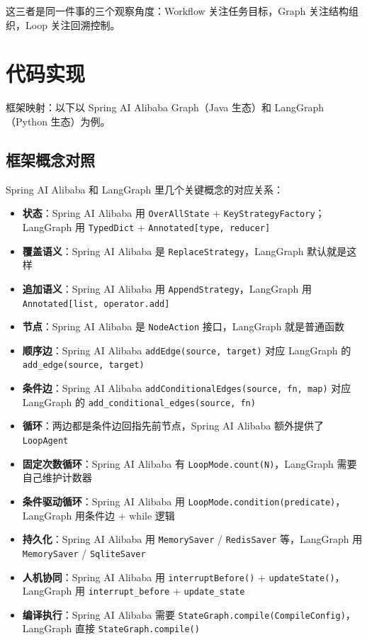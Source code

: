 \documentclass[9pt,a4paper,twocolumn]{ctexart}
\begin{document}
这三者是同一件事的三个观察角度：Workflow 关注任务目标，Graph 关注结构组织，Loop 关注回溯控制。



\section*{代码实现}


框架映射：以下以 Spring AI Alibaba Graph（Java 生态）和 LangGraph（Python 生态）为例。



\subsection*{框架概念对照}


Spring AI Alibaba 和 LangGraph 里几个关键概念的对应关系：


\begin{itemize}[itemsep=1pt, topsep=2pt]
  \item \textbf{状态}：Spring AI Alibaba 用 \texttt{OverAllState} + \texttt{KeyStrategyFactory}；LangGraph 用 \texttt{TypedDict} + \texttt{Annotated[type, reducer]}
  \item \textbf{覆盖语义}：Spring AI Alibaba 是 \texttt{ReplaceStrategy}，LangGraph 默认就是这样
  \item \textbf{追加语义}：Spring AI Alibaba 用 \texttt{AppendStrategy}，LangGraph 用 \texttt{Annotated[list, operator.add]}
  \item \textbf{节点}：Spring AI Alibaba 是 \texttt{NodeAction} 接口，LangGraph 就是普通函数
  \item \textbf{顺序边}：Spring AI Alibaba \texttt{addEdge(source, target)} 对应 LangGraph 的 \texttt{add\_edge(source, target)}
  \item \textbf{条件边}：Spring AI Alibaba \texttt{addConditionalEdges(source, fn, map)} 对应 LangGraph 的 \texttt{add\_conditional\_edges(source, fn)}
  \item \textbf{循环}：两边都是条件边回指先前节点，Spring AI Alibaba 额外提供了 \texttt{LoopAgent}
  \item \textbf{固定次数循环}：Spring AI Alibaba 有 \texttt{LoopMode.count(N)}，LangGraph 需要自己维护计数器
  \item \textbf{条件驱动循环}：Spring AI Alibaba 用 \texttt{LoopMode.condition(predicate)}，LangGraph 用条件边 + while 逻辑
  \item \textbf{持久化}：Spring AI Alibaba 用 \texttt{MemorySaver} / \texttt{RedisSaver} 等，LangGraph 用 \texttt{MemorySaver} / \texttt{SqliteSaver}
  \item \textbf{人机协同}：Spring AI Alibaba 用 \texttt{interruptBefore()} + \texttt{updateState()}，LangGraph 用 \texttt{interrupt\_before} + \texttt{update\_state}
  \item \textbf{编译执行}：Spring AI Alibaba 需要 \texttt{StateGraph.compile(CompileConfig)}，LangGraph 直接 \texttt{StateGraph.compile()}
\end{itemize}
\end{document}
